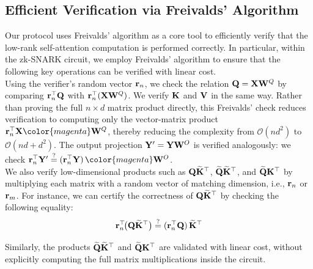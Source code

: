 \documentclass[sigconf,anonymous,review,balance=false]{acmart}
\newcommand{\rev}[1]{{\color{magenta}#1}}
\begin{document}
\subsection{Efficient Verification via Freivalds’ Algorithm}
\label{moore-penrose}
Our protocol uses Freivalds’ algorithm as a core tool to efficiently verify that the low-rank self-attention computation is performed correctly. In particular, within the zk-SNARK circuit, we employ Freivalds’ algorithm to ensure that the following key operations can be verified with linear cost. \\

Using the verifier's random vector ${\mathbf{r}}_n$, we check the relation ${\mathbf{Q}} = {\mathbf{X}} {\mathbf{W}}^Q$ by comparing ${\mathbf{r}}_n^{\top} {\mathbf{Q}}$ with ${\mathbf{r}}_n^{\top}({\mathbf{X}} {\mathbf{W}}^Q)$.
We verify ${\mathbf{K}}$ and ${\mathbf{V}}$ in the same way. Rather than proving the full $n\times d$ matrix product directly, this Freivalds' check reduces verification to computing only the vector-matrix product $\rand_n^{\top}\X \rev{\W^Q}$, thereby reducing the complexity from $\mathcal{O}(n d^2)$ to $\mathcal{O}(nd + d^2)$. The output projection ${\mathbf{Y}}'={\mathbf{Y}} {\mathbf{W}}^O$ is verified analogously: we check $\rand_n^{\top}\Y' \stackrel{?}{=} (\rand_n^{\top}\Y)\,\rev{\W^O}$. \\

We also verify low-dimensional products such as ${\mathbf{Q}}\widetilde{{\mathbf{K}}}^{\top}$,
$\widetilde{{\mathbf{Q}}}\widetilde{{\mathbf{K}}}^{\top}$, and $\widetilde{{\mathbf{Q}}}{\mathbf{K}}^{\top}$
by multiplying each matrix with a random vector of matching dimension,
i.e., ${\mathbf{r}}_n$ or ${\mathbf{r}}_m$.
For instance, we can certify the correctness of ${\mathbf{Q}}\widetilde{{\mathbf{K}}}^{\top}$ by checking the following equality:
\[
{\mathbf{r}}_n^{\top}\!\bigl({\mathbf{Q}}\widetilde{{\mathbf{K}}}^{\top}\bigr)
\stackrel{?}{=}
({\mathbf{r}}_n^{\top}{\mathbf{Q}})\,\widetilde{{\mathbf{K}}}^{\top}
\]

Similarly, the products $\widetilde{{\mathbf{Q}}}\widetilde{{\mathbf{K}}}^{\top}$ and $\widetilde{{\mathbf{Q}}}{\mathbf{K}}^{\top}$ are validated with linear cost, without explicitly computing the full matrix multiplications inside the circuit. \\
\end{document}
